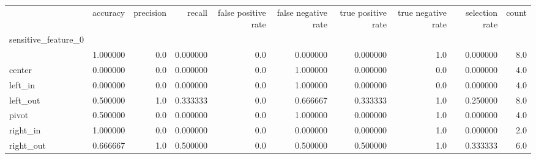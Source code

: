 \begin{tabular}{lrrrrrrrrr}
\toprule
{} &  accuracy &  precision &    recall &  false positive rate &  false negative rate &  true positive rate &  true negative rate &  selection rate &  count \\
sensitive\_feature\_0 &           &            &           &                      &                      &                     &                     &                 &        \\
\midrule
                    &  1.000000 &        0.0 &  0.000000 &                  0.0 &             0.000000 &            0.000000 &                 1.0 &        0.000000 &    8.0 \\
center              &  0.000000 &        0.0 &  0.000000 &                  0.0 &             1.000000 &            0.000000 &                 0.0 &        0.000000 &    4.0 \\
left\_in             &  0.000000 &        0.0 &  0.000000 &                  0.0 &             1.000000 &            0.000000 &                 0.0 &        0.000000 &    4.0 \\
left\_out            &  0.500000 &        1.0 &  0.333333 &                  0.0 &             0.666667 &            0.333333 &                 1.0 &        0.250000 &    8.0 \\
pivot               &  0.500000 &        0.0 &  0.000000 &                  0.0 &             1.000000 &            0.000000 &                 1.0 &        0.000000 &    4.0 \\
right\_in            &  1.000000 &        0.0 &  0.000000 &                  0.0 &             0.000000 &            0.000000 &                 1.0 &        0.000000 &    2.0 \\
right\_out           &  0.666667 &        1.0 &  0.500000 &                  0.0 &             0.500000 &            0.500000 &                 1.0 &        0.333333 &    6.0 \\
\bottomrule
\end{tabular}
